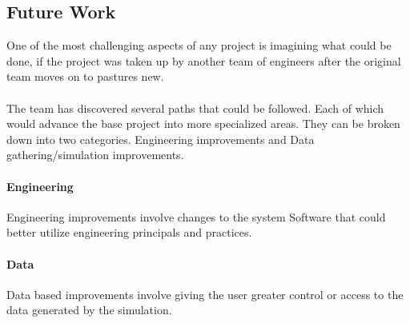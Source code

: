 \documentclass[11pt]{article}
\begin{document}
	
\subsection{Future Work} 
One of the most challenging aspects of any project is imagining what could be done, if the project was taken up by another team of engineers after the original team moves on to pastures new.
\\~\\
The team has discovered several paths that could be followed. Each of which would advance the base project into more specialized areas.
They can be broken down into two categories. Engineering improvements and Data gathering/simulation improvements.

\paragraph{Engineering}
Engineering improvements involve changes to the system Software that could better utilize engineering principals and practices.

\paragraph{Data}
Data based improvements involve giving the user greater control or access to the data generated by the simulation.\\
\end{document}
